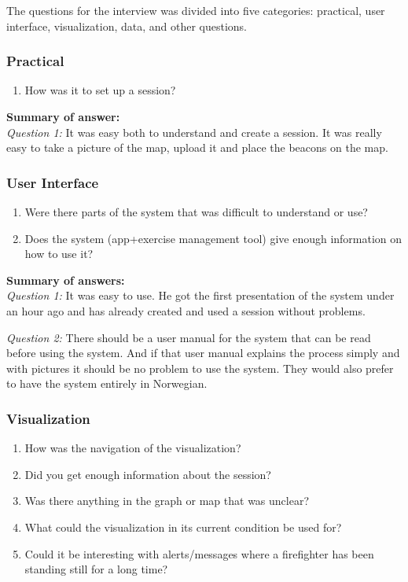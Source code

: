 \documentclass[../Main/thesis.tex]{subfiles}
\begin{document}
The questions for the interview was divided into five categories: practical, user interface, visualization, data, and other questions.

\subsubsection*{Practical}
\begin{enumerate}
	\item How was it to set up a session?
\end{enumerate}

\textbf{Summary of answer:}\\
\textit{Question 1:}
It was easy both to understand and create a session. 
It was really easy to take a picture of the map, upload it and place the beacons on the map.

\subsubsection*{User Interface}
\begin{enumerate}
	\item Were there parts of the system that was difficult to understand or use?
	\item Does the system (app+exercise management tool) give enough information on how to use it?
\end{enumerate}

\textbf{Summary of answers:}\\
\textit{Question 1:}
It was easy to use. 
He got the first presentation of the system under an hour ago and has already created and used a session without problems.

\textit{Question 2:}
There should be a user manual for the system that can be read before using the system. 
And if that user manual explains the process simply and with pictures it should be no problem to use the system.
They would also prefer to have the system entirely in Norwegian. 

\subsubsection*{Visualization}
\begin{enumerate}
	\item How was the navigation of the visualization?
	\item Did you get enough information about the session?
	\item Was there anything in the graph or map that was unclear?
	\item What could the visualization in its current condition be used for?
	\item Could it be interesting with alerts/messages where a firefighter has been standing still for a long time?
\end{enumerate}
\end{document}
